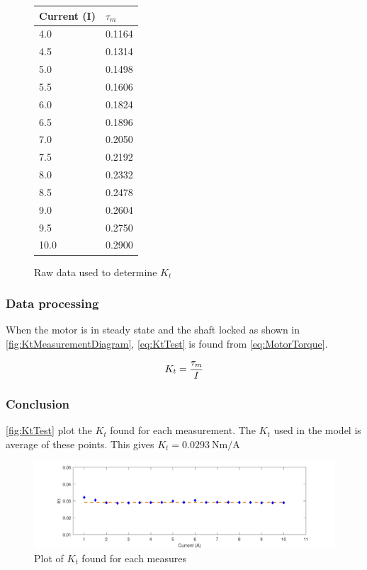 \begin{figure}[htbp]
	\centering
	\caption{Raw data used to determine $K_t$}\label{tab_appendix:KtData}
	\begin{tabularx}{0.35\textwidth}{XX}
		Current (I) & $\tau_m$\\ \toprule \rowcolor{lightGrey}
	4.0 & 0.1164 \\
	4.5 & 0.1314 \\ \rowcolor{lightGrey}
	5.0 & 0.1498 \\
	5.5 & 0.1606 \\ \rowcolor{lightGrey}
	6.0 & 0.1824 \\
	6.5 & 0.1896 \\ \rowcolor{lightGrey}
	7.0 & 0.2050 \\
	7.5 & 0.2192 \\ \rowcolor{lightGrey}
	8.0 & 0.2332 \\
	8.5 & 0.2478 \\ \rowcolor{lightGrey}
	9.0 & 0.2604 \\
	9.5 & 0.2750 \\ \rowcolor{lightGrey}
	10.0 & 0.2900
	\end{tabularx}
\end{figure}

\subsubsection*{Data processing}

When the motor is in steady state and the shaft locked as shown in \autoref{fig:KtMeasurementDiagram}, \autoref{eq:KtTest} is found from \autoref{eq:MotorTorque}.

\begin{equation}\label{eq:KtTest}
	K_t=\frac{\tau_m}{I} \addunit{\newton\meter\per\ampere}
\end{equation}

\startexplain
{}
\stopexplain

\subsubsection*{Conclusion}

\autoref{fig:KtTest} plot the $K_t$ found for each measurement. The $K_t$ used in the model is average of these points. This gives $K_t=\SI{0.0293}{\newton\meter\per\ampere}$

\begin{figure}[htbp]
	\centering
	\includegraphics[width=\textwidth]{figures/appendix/Motor&GearTests/PlotKt}
	\caption{Plot of $K_t$ found for each measures}\label{fig:KtTest}
\end{figure}
